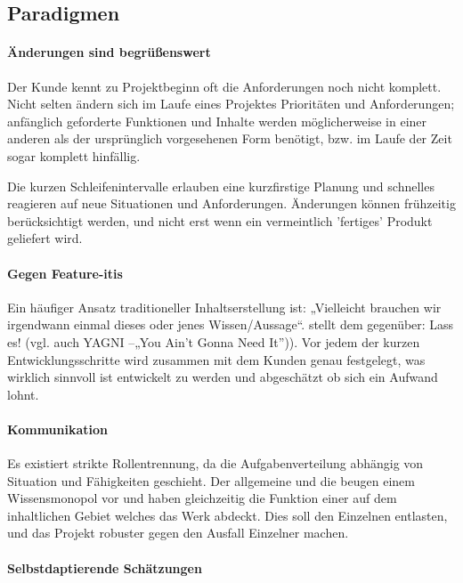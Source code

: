 \documentclass[fontsize=9pt,paper=a4,parskip=half,DIV=11,twocolumn]{scrartcl}
\begin{document}
\subsection{Paradigmen}


\paragraph{Änderungen sind begrüßenswert}

Der Kunde kennt zu Projektbeginn oft die Anforderungen 
noch nicht komplett. Nicht selten ändern sich im Laufe eines  Projektes 
Prioritäten und Anforderungen; anfänglich geforderte Funktionen und Inhalte
werden möglicherweise in einer anderen als der ursprünglich vorgesehenen Form
benötigt, bzw. im Laufe der Zeit sogar komplett hinfällig.

Die kurzen Schleifenintervalle erlauben eine kurzfirstige Planung und schnelles
reagieren auf neue Situationen und Anforderungen. Änderungen können frühzeitig
berücksichtigt werden, und nicht erst wenn ein vermeintlich 'fertiges' Produkt
geliefert wird. 

\paragraph{Gegen Feature-itis} Ein häufiger Ansatz traditioneller
Inhaltserstellung ist: „Vielleicht brauchen wir irgendwann einmal dieses oder jenes Wissen/Aussage“. \ADCD{} stellt dem
gegenüber: Lass es! (vgl. auch YAGNI –„You Ain’t Gonna Need It”)).  Vor jedem
der kurzen Entwicklungsschritte wird zusammen mit dem Kunden genau festgelegt, 
was wirklich sinnvoll ist entwickelt zu werden und abgeschätzt ob sich ein
Aufwand lohnt. 


\paragraph{Kommunikation}

Es existiert  strikte Rollentrennung, da die Aufgabenverteilung
abhängig von Situation und Fähigkeiten geschieht. Der allgemeine
 und die  beugen einem
Wissensmonopol vor und haben gleichzeitig die Funktion einer  auf dem inhaltlichen Gebiet welches das Werk abdeckt.
Dies soll den Einzelnen entlasten, und das Projekt robuster gegen den Ausfall
Einzelner machen.

\paragraph{Selbstdaptierende Schätzungen}	
\end{document}
